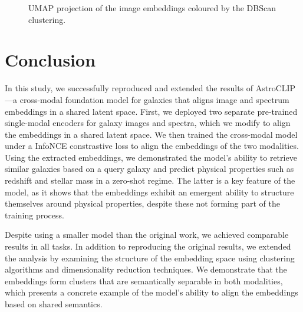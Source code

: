 \documentclass[a4paper,12pt]{article}
\begin{document}
\begin{figure}[H]
    \centering
    \caption{UMAP projection of the image embeddings coloured by the DBScan clustering.}
    \label{fig:annotated_images}
\end{figure}




\section{Conclusion}
In this study, we successfully reproduced and extended the results of AstroCLIP—a cross-modal foundation model for galaxies that aligns image and spectrum embeddings in a shared latent space. First, we deployed two separate pre-trained single-modal encoders for galaxy images and spectra, which we modify to align the embeddings in a shared latent space. We then trained the cross-modal model under a InfoNCE constrastive loss to align the embeddings of the two modalities. Using the extracted embeddings, we demonstrated the model's ability to retrieve similar galaxies based on a query galaxy and predict physical properties such as redshift and stellar mass in a zero-shot regime. The latter is a key feature of the model, as it shows that the embeddings exhibit an emergent ability to structure themselves around physical properties, despite these not forming part of the training process.


Despite using a smaller model than the original work, we achieved comparable results in all tasks. In addition to reproducing the original results, we extended the analysis by examining the structure of the embedding space using clustering algorithms and dimensionality reduction techniques. We demonstrate that the embeddings form clusters that are semantically separable in both modalities, which presents a concrete example of the model's ability to align the embeddings based on shared semantics. 
\end{document}
